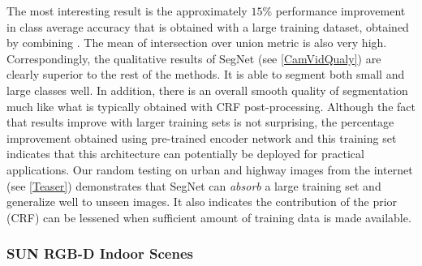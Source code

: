 The most interesting result is the approximately $15\%$ performance improvement in class average accuracy that is obtained with a large training dataset, obtained by combining \citep{gould2009decomposing,russell2008labelme,brostow2009semantic,Geiger2012CVPR}. The mean of intersection over union metric is also very high. Correspondingly, the qualitative results of SegNet (see \cref{CamVidQualy}) are clearly superior to the rest of the methods. It is able to segment both small and large classes well. In addition, there is an overall smooth quality of segmentation much like what is typically obtained with CRF post-processing. Although the fact that results improve with larger training sets is not surprising, the percentage improvement obtained using pre-trained encoder network and this training set indicates that this architecture can potentially be deployed for practical applications. Our random testing on urban and highway images from the internet (see \cref{Teaser}) demonstrates that SegNet can \textit{absorb} a large training set and generalize well to unseen images. It also indicates the contribution of the prior (CRF) can be lessened when sufficient amount of training data is made available.

\subsubsection{SUN RGB-D Indoor Scenes}
\label{SUNRGBD}

